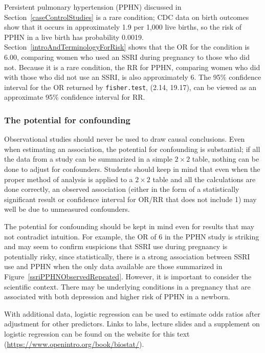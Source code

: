 Persistent pulmonary hypertension (PPHN) discussed in Section~\ref{caseControlStudies} is a rare condition; CDC data on birth outcomes show that it occurs in approximately 1.9 per 1,000 live births, so the risk of PPHN in a live birth has probability 0.0019. Section~\ref{introAndTerminologyForRisk} shows that the OR for the condition is 6.00, comparing women who used an SSRI during pregnancy to those who did not.  Because it is a rare condition, the RR for PPHN, comparing women who did with those who did not use an SSRI, is also approximately 6.  The 95\% confidence interval for the OR returned by \texttt{fisher.test}, (2.14, 19.17), can be viewed as an approximate 95\% confidence interval for RR.

\subsubsection{The potential for confounding}

Observational studies should never be used to draw causal conclusions.  Even when estimating an association, the potential for confounding is substantial; if all the data from a study can be summarized in a simple $2 \times 2$ table, nothing can be done to adjust for confounders.  Students should keep in mind that even when the proper method of analysis is applied to a $2 \times 2$ table and all the calculations are done correctly, an observed association (either in the form of a statistically significant result or confidence interval for OR/RR that does not include 1) may well be due to unmeasured confounders.

The potential for confounding should be kept in mind even for results that may not contradict intuition. For example, the OR of 6 in the PPHN study is striking and may seem to confirm suspicions that SSRI use during pregnancy is potentially risky, since statistically, there is a strong association between SSRI use and PPHN when the only data available are those summarized in Figure~\ref{ssriPPHNObservedRepeated}. However, it is important to consider the scientific context. There may be underlying conditions in a pregnancy that are associated with both depression and higher risk of PPHN in a newborn.


With additional data, logistic regression can be used to estimate odds ratios after adjustment for other predictors. Links to labs, lecture slides and a supplement on logistic regression can be found on the website for this text (\url{https://www.openintro.org/book/biostat/}).


